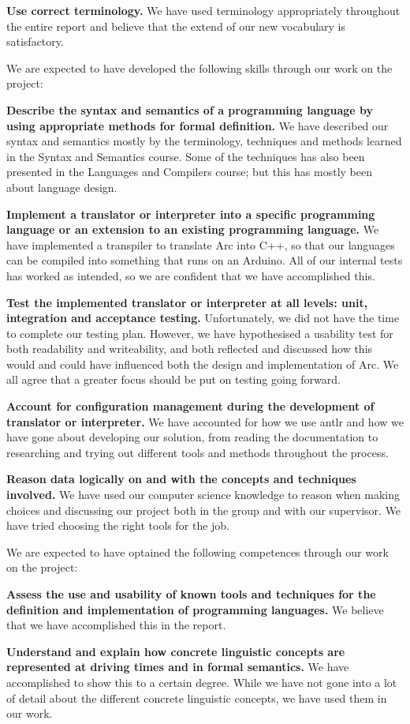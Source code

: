 \textbf{Use correct terminology.} We have used terminology appropriately throughout the entire report and believe that the extend of our new vocabulary is satisfactory.

We are expected to have developed the following skills through our work on the project:

\textbf{Describe the syntax and semantics of a programming language by using appropriate methods for formal definition.} We have described our syntax and semantics mostly by the terminology, techniques and methods learned in the Syntax and Semantics course. Some of the techniques has also been presented in the Languages and Compilers course; but this has mostly been about language design.

\textbf{Implement a translator or interpreter into a specific programming language or an extension to an existing programming language.} We have implemented a transpiler to translate Arc into C++, so that our languages can be compiled into something that runs on an Arduino. All of our internal tests has worked as intended, so we are confident that we have accomplished this.

\textbf{Test the implemented translator or interpreter at all levels: unit, integration and acceptance testing.} Unfortunately, we did not have the time to complete our testing plan. However, we have hypothesised a usability test for both readability and writeability, and both reflected and discussed how this would and could have influenced both the design and implementation of Arc. We all agree that a greater focus should be put on testing going forward.

\textbf{Account for configuration management during the development of translator or interpreter.} We have accounted for how we use \gls{antlr} and how we have gone about developing our solution, from reading the documentation to researching and trying out different tools and methods throughout the process.

\textbf{Reason data logically on and with the concepts and techniques involved.} We have used our computer science knowledge to reason when making choices and discussing our project both in the group and with our supervisor. We have tried choosing the right tools for the job.

We are expected to have optained the following competences through our work on the project:

\textbf{Assess the use and usability of known tools and techniques for the definition and implementation of programming languages.} We believe that we have accomplished this in the report.

\textbf{Understand and explain how concrete linguistic concepts are represented at driving times and in formal semantics.} We have accomplished to show this to a certain degree. While we have not gone into a lot of detail about the different concrete linguistic concepts, we have used them in our work.